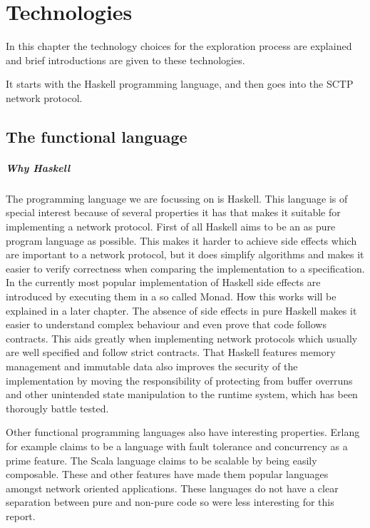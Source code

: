 \chapter{Technologies}
In this chapter the technology choices for the exploration process are explained and brief introductions are given to these technologies.

It starts with the Haskell programming language, and then goes into the SCTP network protocol.

\section{The functional language}
\paragraph{Why Haskell}
The programming language we are focussing on is Haskell.
This language is of special interest because of several properties it has that makes it suitable for implementing a network protocol.
First of all Haskell aims to be an as pure program language as possible. This makes it harder to achieve side effects which are important to a network protocol, but it does simplify algorithms and makes it easier to verify correctness when comparing the implementation to a specification.
In the currently most popular implementation of Haskell side effects are introduced by executing them in a so called Monad.
How this works will be explained in a later chapter.
The absence of side effects in pure Haskell makes it easier to understand complex behaviour and even prove that code follows contracts.
This aids greatly when implementing network protocols which usually are well specified and follow strict contracts.
That Haskell features memory management and immutable data also improves the security of the implementation by moving the responsibility of protecting from buffer overruns and other unintended state manipulation to the runtime system, which has been thorougly battle tested.

Other functional programming languages also have interesting properties.
Erlang for example claims to be a language with fault tolerance and concurrency as a prime feature\cite{armstrong_concurrent_1993}.
The Scala language claims to be scalable by being easily composable\cite{odersky_overview_????}.
These and other features have made them popular languages amongst network oriented applications. %
These languages do not have a clear separation between pure and non-pure code so were less interesting for this report.
